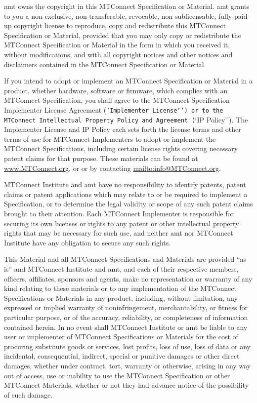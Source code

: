 \gls{amt} owns the copyright in this \gls{MTConnect} Specification or Material. \gls{amt} grants to you a non-exclusive, non-transferable, revocable, non-sublicensable, fully-paid-up copyright license to reproduce, copy and redistribute this \gls{MTConnect} Specification or Material, provided that you may only copy or redistribute the \gls{MTConnect} Specification or Material in the form in which you received it, without modifications, and with all copyright notices and other notices and disclaimers contained in the \gls{MTConnect} Specification or Material.

If you intend to adopt or implement an \gls{MTConnect} Specification or Material in a product, whether hardware, software or firmware, which complies with an \gls{MTConnect} Specification, you shall agree to the \gls{MTConnect} Specification Implementer License Agreement (\texttt{`Implementer License'') or to the \gls{MTConnect} Intellectual Property Policy and Agreement (}`IP Policy''). The Implementer License and IP Policy each sets forth the license terms and other terms of use for \gls{MTConnect} Implementers to adopt or implement the \gls{MTConnect} Specifications, including certain license rights covering necessary patent claims for that purpose. These materials can be found at \url{www.MTConnect.org}, or or by contacting \url{mailto:info@MTConnect.org}. 

\gls{MTConnect} Institute and \gls{amt} have no responsibility to identify patents, patent claims or patent applications which may relate to or be required to implement a Specification, or to determine the legal validity or scope of any such patent claims brought to their attention. Each \gls{MTConnect} Implementer is responsible for securing its own licenses or rights to any patent or other intellectual property rights that may be necessary for such use, and neither \gls{amt} nor \gls{MTConnect} Institute have any obligation to secure any such rights.

This Material and all \gls{MTConnect} Specifications and Materials are provided ``as is'' and \gls{MTConnect} Institute and \gls{amt}, and each of their respective members, officers, affiliates, sponsors and agents, make no representation or warranty of any kind relating to these materials or to any implementation of the \gls{MTConnect} Specifications or Materials in any product, including, without limitation, any expressed or implied warranty of noninfringement, merchantability, or fitness for particular purpose, or of the accuracy, reliability, or completeness of information contained herein. In no event shall \gls{MTConnect} Institute or \gls{amt} be liable to any user or implementer of \gls{MTConnect} Specifications or Materials for the cost of procuring substitute goods or services, lost profits, loss of use, loss of data or any incidental, consequential, indirect, special or punitive damages or other direct damages, whether under contract, tort, warranty or otherwise, arising in any way out of access, use or inability to use the \gls{MTConnect} Specification or other \gls{MTConnect} Materials, whether or not they had advance notice of the possibility of such damage.
